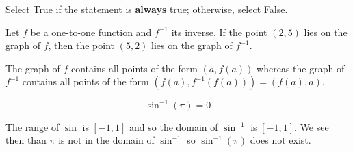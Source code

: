 \documentclass{ximera}
\author{Nela Lakos \and Kyle Parsons}
\begin{document}
\begin{exercise}

Select True if the statement is \textbf{always} true; otherwise, select False.

Let $f$ be a one-to-one function and $f^{-1}$ its inverse.  If the point $(2,5)$ lies on the graph of $f$, then the point $(5,2)$ lies on the graph of $f^{-1}$.

\begin{multipleChoice}
\end{multipleChoice}

\begin{feedback}
The graph of $f$ contains all points of the form $\left(a,f(a)\right)$ whereas the graph of $f^{-1}$ contains all points of the form $\left(f(a),f^{-1}(f(a))\right)=(f(a),a)$.
\end{feedback}

\begin{exercise}

\[
\sin^{-1}(\pi) = 0
\]

\begin{multipleChoice}
\end{multipleChoice}

\begin{feedback}
The range of $\sin$ is $\left[-1,1\right]$ and so the domain of $\sin^{-1}$ is $\left[-1,1\right]$.  We see then than $\pi$ is not in the domain of $\sin^{-1}$ so $\sin^{-1}(\pi)$ does not exist.
\end{feedback}

\end{exercise}
\end{exercise}
\end{document}
